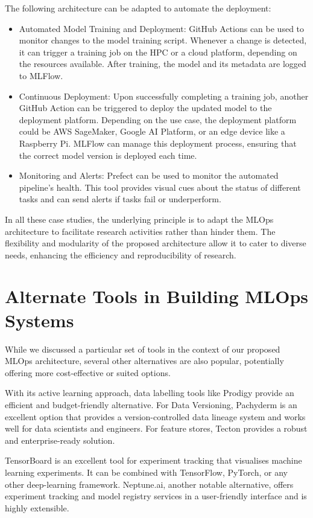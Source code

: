 The following architecture can be adapted to automate the deployment:

\begin{itemize}
    \item Automated Model Training and Deployment: GitHub Actions can be used to monitor changes to the model training script. Whenever a change is detected, it can trigger a training job on the HPC or a cloud platform, depending on the resources available. After training, the model and its metadata are logged to MLFlow.
    \item Continuous Deployment: Upon successfully completing a training job, another GitHub Action can be triggered to deploy the updated model to the deployment platform. Depending on the use case, the deployment platform could be AWS SageMaker, Google AI Platform, or an edge device like a Raspberry Pi. MLFlow can manage this deployment process, ensuring that the correct model version is deployed each time.
    \item Monitoring and Alerts: Prefect can be used to monitor the automated pipeline's health. This tool provides visual cues about the status of different tasks and can send alerts if tasks fail or underperform.
\end{itemize}

In all these case studies, the underlying principle is to adapt the MLOps architecture to facilitate research activities rather than hinder them. The flexibility and modularity of the proposed architecture allow it to cater to diverse needs, enhancing the efficiency and reproducibility of research.

\section{Alternate Tools in Building MLOps Systems \label{alternates}}
While we discussed a particular set of tools in the context of our proposed MLOps architecture, several other alternatives are also popular, potentially offering more cost-effective or suited options.

With its active learning approach, data labelling tools like Prodigy provide an efficient and budget-friendly alternative. For Data Versioning, Pachyderm is an excellent option that provides a version-controlled data lineage system and works well for data scientists and engineers. For feature stores, Tecton provides a robust and enterprise-ready solution.

TensorBoard is an excellent tool for experiment tracking that visualises machine learning experiments. It can be combined with TensorFlow, PyTorch, or any other deep-learning framework. Neptune.ai, another notable alternative, offers experiment tracking and model registry services in a user-friendly interface and is highly extensible.

